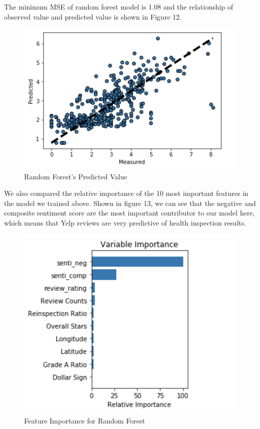 \documentclass[letterpaper, 11 pt, conference]{ieeeconf}
\begin{document}
The minimum MSE of random forest model is 1.08 and the relationship of observed value and predicted value is shown in Figure 12. 
\begin{figure}[h]
	\centering
    \includegraphics[scale = 0.6]{random_forest_result_updated}
    \caption{Random Forest's Predicted Value}
\end{figure}
We also compared the relative importance of the 10 most important features in the model we trained above. Shown in figure 13, we can see that the negative and composite sentiment score are the most important contributor to our model here, which means that Yelp reviews are very predictive of health inspection results. 
\begin{figure}[h]
	\centering
    \includegraphics[scale = 0.7]{random_forest_features}
    \caption{Feature Importance for Random Forest}
\end{figure}
\end{document}
